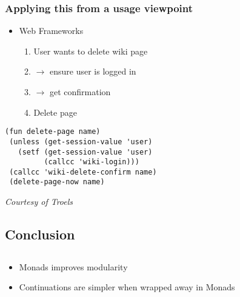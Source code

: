 \documentclass{beamer}
\begin{document}
\begin{frame}[fragile]
\frametitle{Applying this from a usage viewpoint}
\begin{itemize}
\item Web Frameworks
  \begin{enumerate}
  \item User wants to delete wiki page
  \item $\rightarrow$ ensure user is logged in 
  \item $\rightarrow$ get confirmation
  \item Delete page

  \end{enumerate}
\end{itemize}

\lstset{basicstyle=\footnotesize\ttfamily}
\begin{lstlisting}
(fun delete-page name)
 (unless (get-session-value 'user)
   (setf (get-session-value 'user) 
         (callcc 'wiki-login)))
 (callcc 'wiki-delete-confirm name)
 (delete-page-now name)
\end{lstlisting}
\small
\emph{Courtesy of Troels}

\end{frame}


\begin{frame}[fragile]
\section{Conclusion}
\subsection{}
\begin{itemize}
\item Monads improves modularity
\item Continuations are simpler when wrapped away in Monads
\end{itemize}
\end{frame}
\end{document}
